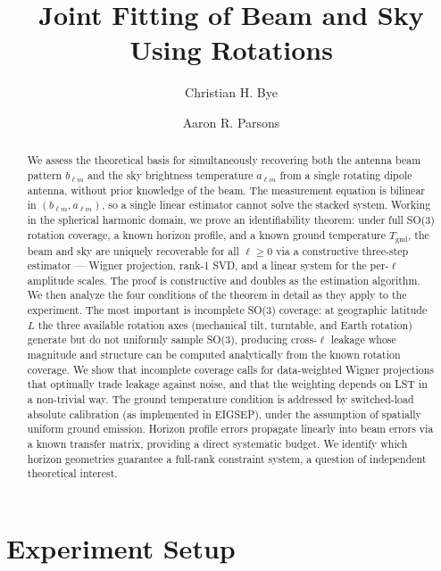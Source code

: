 \documentclass{aastex631}
\newcommand{\Tgnd}{T_\mathrm{gnd}}
\theoremstyle{plain}
\theoremstyle{remark}
\begin{document}
\title{Joint Fitting of Beam and Sky Using Rotations}


\author{Christian H. Bye}
\author{Aaron R. Parsons}

\begin{abstract}
We assess the theoretical basis for simultaneously recovering both the
antenna beam pattern $b_{\ell m}$ and the sky brightness temperature
$a_{\ell m}$ from a single rotating dipole antenna, without prior
knowledge of the beam.
The measurement equation is bilinear in $(b_{\ell m}, a_{\ell m})$,
so a single linear estimator cannot solve the stacked system.
Working in the spherical harmonic domain, we prove an identifiability
theorem: under full SO(3) rotation coverage, a known horizon profile,
and a known ground temperature $\Tgnd$, the beam and sky are uniquely
recoverable for all $\ell \geq 0$ via a constructive three-step
estimator --- Wigner projection, rank-1 SVD, and a linear system for
the per-$\ell$ amplitude scales.
The proof is constructive and doubles as the estimation algorithm.
We then analyze the four conditions of the theorem in detail as they
apply to the experiment.
The most important is incomplete SO(3) coverage: at geographic latitude
$L$ the three available rotation axes (mechanical tilt, turntable, and
Earth rotation) generate but do not uniformly sample SO(3), producing
cross-$\ell$ leakage whose magnitude and structure can be computed
analytically from the known rotation coverage.
We show that incomplete coverage calls for data-weighted Wigner
projections that optimally trade leakage against noise, and that
the weighting depends on LST in a non-trivial way.
The ground temperature condition is addressed by switched-load
absolute calibration (as implemented in EIGSEP), under the assumption
of spatially uniform ground emission.
Horizon profile errors propagate linearly into beam errors via a
known transfer matrix, providing a direct systematic budget.
We identify which horizon geometries guarantee a full-rank constraint
system, a question of independent theoretical interest.
\end{abstract}

\section{Experiment Setup} \label{sec:setup}
\end{document}

